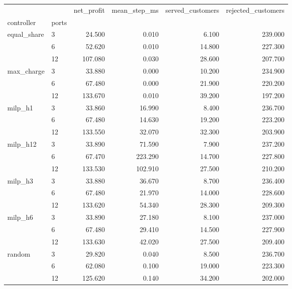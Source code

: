 \begin{tabular}{llrrrr}
\toprule
 &  & net_profit & mean_step_ms & served_customers & rejected_customers \\
controller & ports &  &  &  &  \\
\midrule
\multirow[t]{3}{*}{equal_share} & 3 & 24.500 & 0.010 & 6.100 & 239.000 \\
 & 6 & 52.620 & 0.010 & 14.800 & 227.300 \\
 & 12 & 107.080 & 0.030 & 28.600 & 207.700 \\
\cline{1-6}
\multirow[t]{3}{*}{max_charge} & 3 & 33.880 & 0.000 & 10.200 & 234.900 \\
 & 6 & 67.480 & 0.000 & 21.900 & 220.200 \\
 & 12 & 133.670 & 0.010 & 39.200 & 197.200 \\
\cline{1-6}
\multirow[t]{3}{*}{milp_h1} & 3 & 33.860 & 16.990 & 8.400 & 236.700 \\
 & 6 & 67.480 & 14.630 & 19.200 & 223.200 \\
 & 12 & 133.550 & 32.070 & 32.300 & 203.900 \\
\cline{1-6}
\multirow[t]{3}{*}{milp_h12} & 3 & 33.890 & 71.590 & 7.900 & 237.200 \\
 & 6 & 67.470 & 223.290 & 14.700 & 227.800 \\
 & 12 & 133.530 & 102.910 & 27.500 & 210.200 \\
\cline{1-6}
\multirow[t]{3}{*}{milp_h3} & 3 & 33.880 & 36.670 & 8.700 & 236.400 \\
 & 6 & 67.480 & 21.970 & 14.000 & 228.600 \\
 & 12 & 133.620 & 54.340 & 28.300 & 209.300 \\
\cline{1-6}
\multirow[t]{3}{*}{milp_h6} & 3 & 33.890 & 27.180 & 8.100 & 237.000 \\
 & 6 & 67.480 & 29.410 & 14.500 & 227.900 \\
 & 12 & 133.630 & 42.020 & 27.500 & 209.400 \\
\cline{1-6}
\multirow[t]{3}{*}{random} & 3 & 29.820 & 0.040 & 8.500 & 236.700 \\
 & 6 & 62.080 & 0.100 & 19.000 & 223.300 \\
 & 12 & 125.620 & 0.140 & 34.200 & 202.000 \\
\cline{1-6}
\bottomrule
\end{tabular}
